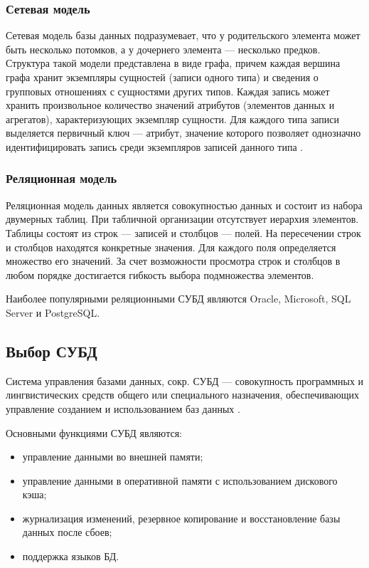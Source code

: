 \subsubsection{Сетевая модель}

Сетевая модель базы данных подразумевает, что у родительского элемента может быть несколько потомков, а у дочернего элемента --- несколько предков. Структура такой модели представлена в виде графа, причем каждая вершина графа хранит экземпляры сущностей (записи одного типа) и сведения о групповых отношениях с сущностями других типов. Каждая запись может хранить произвольное количество значений атрибутов (элементов данных и агрегатов), характеризующих экземпляр сущности. Для каждого типа записи выделяется первичный ключ --- атрибут, значение которого позволяет однозначно идентифицировать запись среди экземпляров записей данного типа \cite{setmodel}.

\subsubsection{Реляционная модель}

Реляционная модель данных является совокупностью данных и состоит из набора двумерных таблиц. При табличной организации отсутствует иерархия элементов. Таблицы состоят из строк --- записей и столбцов --- полей. На пересечении строк и столбцов находятся конкретные значения. Для каждого поля определяется множество его значений. За счет возможности просмотра строк и столбцов в любом порядке достигается гибкость выбора подмножества элементов.

Наиболее популярными реляционными СУБД являются Oracle, Microsoft, SQL Server и PostgreSQL.

\subsection{Выбор СУБД}

Система управления базами данных, сокр. СУБД --- совокупность программных и лингвистических средств общего или специального назначения, обеспечивающих управление созданием и использованием баз данных \cite{subd}.

Основными функциями СУБД являются:

\begin{itemize}[label=---]
	\item управление данными во внешней памяти;
	\item управление данными в оперативной памяти с использованием дискового кэша;
	\item журнализация изменений, резервное копирование и восстановление базы данных после сбоев;
	\item поддержка языков БД.
\end{itemize}

